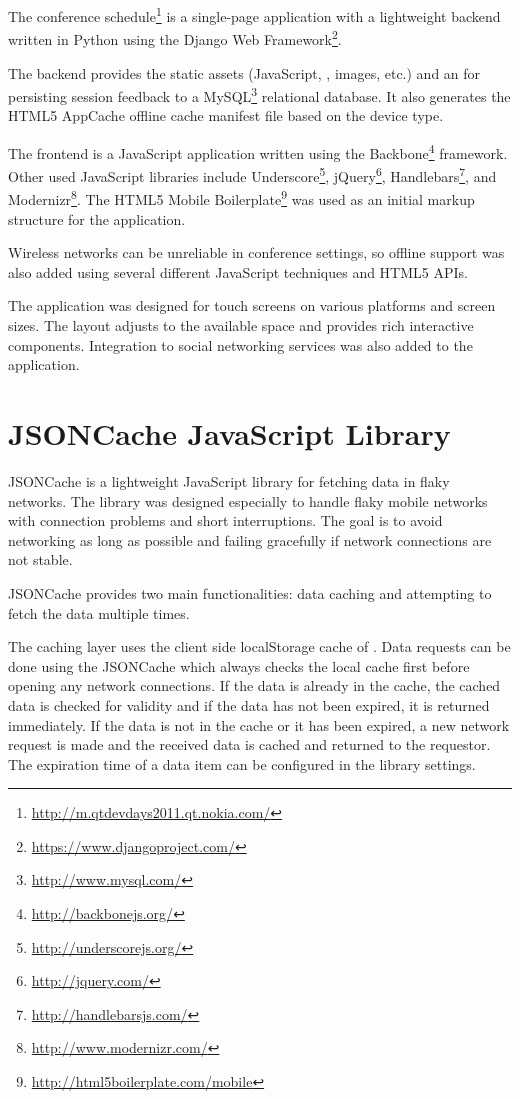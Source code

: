 The conference
schedule\footnote{\url{http://m.qtdevdays2011.qt.nokia.com/}} is a
single-page application \citationneeded with a lightweight backend
written in Python using the Django Web
Framework\footnote{\url{https://www.djangoproject.com/}}.

The backend provides the static assets (JavaScript, ,
images, etc.) and an  for persisting session feedback to a
MySQL\footnote{\url{http://www.mysql.com/}} relational database. It
also generates the HTML5 AppCache \citationneeded offline cache
manifest file based on the device type.

The frontend is a JavaScript application written using the
Backbone\footnote{\url{http://backbonejs.org/}} 
framework. Other used JavaScript libraries include
Underscore\footnote{\url{http://underscorejs.org/}},
jQuery\footnote{\url{http://jquery.com/}},
Handlebars\footnote{\url{http://handlebarsjs.com/}}, and
Modernizr\footnote{\url{http://www.modernizr.com/}}. The HTML5 Mobile
Boilerplate\footnote{\url{http://html5boilerplate.com/mobile}} was
used as an initial markup structure for the application.

Wireless networks can be unreliable in conference settings, so offline
support was also added using several different JavaScript techniques
and HTML5 APIs.

The application was designed for touch screens on various platforms
and screen sizes. The layout adjusts to the available space and
provides rich interactive components. Integration to social networking
services was also added to the application.

\section{JSONCache JavaScript Library}
\label{section:jsoncache}

JSONCache is a lightweight JavaScript library for fetching 
data in flaky networks. The library was designed especially to handle
flaky mobile networks with connection problems and short
interruptions. The goal is to avoid networking as long as possible and
failing gracefully if network connections are not stable.

JSONCache provides two main functionalities: data caching and
attempting to fetch the data multiple times.

The caching layer uses the client side localStorage \citationneeded
cache of . Data requests can be done using the JSONCache
 which always checks the local cache first before opening
any network connections. If the data is already in the cache, the
cached data is checked for validity and if the data has not been
expired, it is returned immediately. If the data is not in the cache
or it has been expired, a new network request is made and the received
data is cached and returned to the requestor. The expiration time of a
data item can be configured in the library settings.

